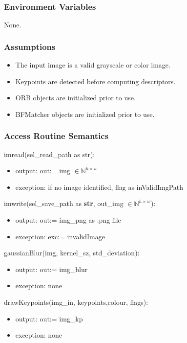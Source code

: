 \documentclass[12pt, titlepage]{article}
\begin{document}
\subsubsection{Environment Variables}
None.

\subsubsection{Assumptions}
\begin{itemize}
    \item The input image is a valid grayscale or color image.
    \item Keypoints are detected before computing descriptors.
    \item ORB objects are initialized prior to use.
    \item BFMatcher objects are initialized prior to use.
\end{itemize}

\subsubsection{Access Routine Semantics}

\noindent imread(sel\_read\_path as str):
\begin{itemize}
\item output: out:= img $\in \mathbb{N}^{h \times w}$
\item exception: if no image identified, flag as inValidImgPath 
\end{itemize}

\noindent imwrite(sel\_save\_path as \textbf{str}, out\_img 
$\in \mathbb{N}^{h \times w}$):
\begin{itemize}
\item output: out:= img\_png as .png file
\item exception: exc:= invalidImage
\end{itemize}

\noindent gaussianBlur(img, kernel\_sz, std\_deviation):
\begin{itemize}
    \item output: out:= img\_blur
    \item exception: none
\end{itemize}

\noindent drawKeypoints(img\_in, keypoints,colour, flags):
\begin{itemize}
\item output: out:= img\_kp 
\item exception: none
\end{itemize}
\end{document}
